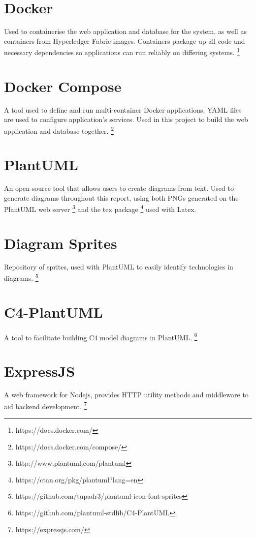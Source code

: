 \section{Docker}
Used to containerise the web application and database for the system, as well as containers from Hyperledger Fabric images. 
Containers package up all code and necessary dependencies so applications can run reliably on differing systems. \footnote{https://docs.docker.com/}

\section{Docker Compose}
A tool used to define and run multi-container Docker applications. YAML files are used to configure application's services. 
Used in this project to build the web application and database together. \footnote{https://docs.docker.com/compose/}

\section{PlantUML}
An open-source tool that allows users to create diagrams from text. 
Used to generate diagrams throughout this report, using both PNGs generated on the PlantUML web server \footnote{http://www.plantuml.com/plantuml} and the tex package \footnote{https://ctan.org/pkg/plantuml?lang=en} used with Latex. \label{appendix:plantuml}

\section{Diagram Sprites}
Repository of sprites, used with PlantUML to easily identify technologies in diagrams. \footnote{https://github.com/tupadr3/plantuml-icon-font-sprites} \label{appendix:sprites}

\section{C4-PlantUML}
A tool to facilitate building C4 model diagrams in PlantUML. \footnote{https://github.com/plantuml-stdlib/C4-PlantUML} \label{appendix:c4plantuml}

\section{ExpressJS}
A web framework for Nodejs, provides HTTP utility methods and middleware to aid backend development. \footnote{https://expressjs.com/}


